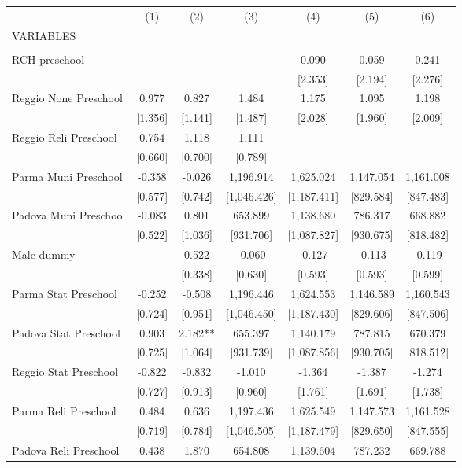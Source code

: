 \begin{tabular}{lcccccc} \hline
 & (1) & (2) & (3) & (4) & (5) & (6) \\
VARIABLES &  &  &  &  &  &  \\ \hline
 &  &  &  &  &  &  \\
RCH preschool &  &  &  & 0.090 & 0.059 & 0.241 \\
 &  &  &  & [2.353] & [2.194] & [2.276] \\
Reggio None Preschool & 0.977 & 0.827 & 1.484 & 1.175 & 1.095 & 1.198 \\
 & [1.356] & [1.141] & [1.487] & [2.028] & [1.960] & [2.009] \\
Reggio Reli Preschool & 0.754 & 1.118 & 1.111 &  &  &  \\
 & [0.660] & [0.700] & [0.789] &  &  &  \\
Parma Muni Preschool & -0.358 & -0.026 & 1,196.914 & 1,625.024 & 1,147.054 & 1,161.008 \\
 & [0.577] & [0.742] & [1,046.426] & [1,187.411] & [829.584] & [847.483] \\
Padova Muni Preschool & -0.083 & 0.801 & 653.899 & 1,138.680 & 786.317 & 668.882 \\
 & [0.522] & [1.036] & [931.706] & [1,087.827] & [930.675] & [818.482] \\
Male dummy &  & 0.522 & -0.060 & -0.127 & -0.113 & -0.119 \\
 &  & [0.338] & [0.630] & [0.593] & [0.593] & [0.599] \\
Parma Stat Preschool & -0.252 & -0.508 & 1,196.446 & 1,624.553 & 1,146.589 & 1,160.543 \\
 & [0.724] & [0.951] & [1,046.450] & [1,187.430] & [829.606] & [847.506] \\
Padova Stat Preschool & 0.903 & 2.182** & 655.397 & 1,140.179 & 787.815 & 670.379 \\
 & [0.725] & [1.064] & [931.739] & [1,087.856] & [930.705] & [818.512] \\
Reggio Stat Preschool & -0.822 & -0.832 & -1.010 & -1.364 & -1.387 & -1.274 \\
 & [0.727] & [0.913] & [0.960] & [1.761] & [1.691] & [1.738] \\
Parma Reli Preschool & 0.484 & 0.636 & 1,197.436 & 1,625.549 & 1,147.573 & 1,161.528 \\
 & [0.719] & [0.784] & [1,046.505] & [1,187.479] & [829.650] & [847.555] \\
Padova Reli Preschool & 0.438 & 1.870 & 654.808 & 1,139.604 & 787.232 & 669.788 \\

\end{tabular}
